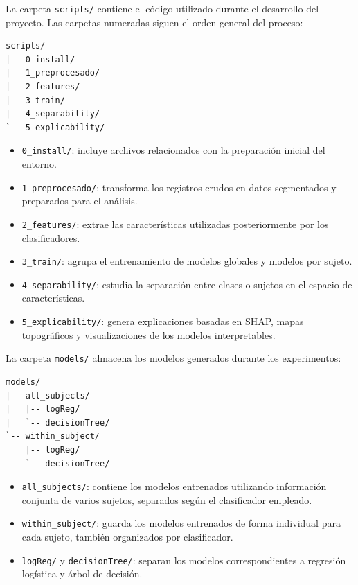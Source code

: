 La carpeta \texttt{scripts/} contiene el código utilizado durante el desarrollo del proyecto. Las carpetas numeradas siguen el orden general del proceso:

\begin{lstlisting}
scripts/
|-- 0_install/
|-- 1_preprocesado/
|-- 2_features/
|-- 3_train/
|-- 4_separability/
`-- 5_explicability/
\end{lstlisting}

\begin{itemize}
    \item \texttt{0\_install/}: incluye archivos relacionados con la preparación inicial del entorno.
    \item \texttt{1\_preprocesado/}: transforma los registros crudos en datos segmentados y preparados para el análisis.
    \item \texttt{2\_features/}: extrae las características utilizadas posteriormente por los clasificadores.
    \item \texttt{3\_train/}: agrupa el entrenamiento de modelos globales y modelos por sujeto.
    \item \texttt{4\_separability/}: estudia la separación entre clases o sujetos en el espacio de características.
    \item \texttt{5\_explicability/}: genera explicaciones basadas en \ac{SHAP}, mapas topográficos y visualizaciones de los modelos interpretables.
\end{itemize}

La carpeta \texttt{models/} almacena los modelos generados durante los experimentos:

\begin{lstlisting}
models/
|-- all_subjects/
|   |-- logReg/
|   `-- decisionTree/
`-- within_subject/
    |-- logReg/
    `-- decisionTree/
\end{lstlisting}

\begin{itemize}
    \item \texttt{all\_subjects/}: contiene los modelos entrenados utilizando información conjunta de varios sujetos, separados según el clasificador empleado.
    \item \texttt{within\_subject/}: guarda los modelos entrenados de forma individual para cada sujeto, también organizados por clasificador.
    \item \texttt{logReg/} y \texttt{decisionTree/}: separan los modelos correspondientes a regresión logística y árbol de decisión.
\end{itemize}


